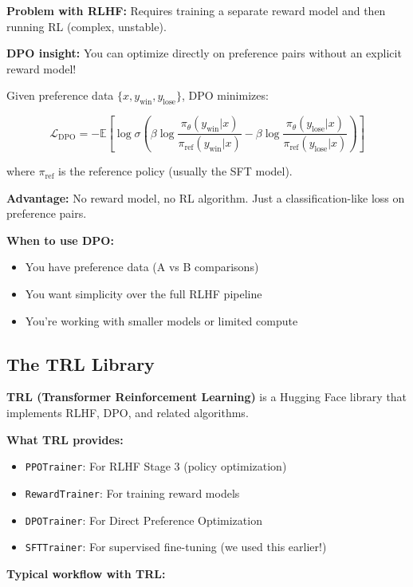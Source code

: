 \documentclass{article}
\begin{document}
\textbf{Problem with RLHF:} Requires training a separate reward model and then running RL (complex, unstable).

\textbf{DPO insight:} You can optimize directly on preference pairs without an explicit reward model!

Given preference data $\{x, y_{\text{win}}, y_{\text{lose}}\}$, DPO minimizes:

\begin{equation}
\mathcal{L}_{\text{DPO}} = -\mathbb{E} \left[ \log \sigma\left( \beta \log \frac{\pi_\theta(y_{\text{win}}|x)}{\pi_{\text{ref}}(y_{\text{win}}|x)} - \beta \log \frac{\pi_\theta(y_{\text{lose}}|x)}{\pi_{\text{ref}}(y_{\text{lose}}|x)} \right) \right]
\end{equation}

where $\pi_{\text{ref}}$ is the reference policy (usually the SFT model).

\textbf{Advantage:} No reward model, no RL algorithm. Just a classification-like loss on preference pairs.

\textbf{When to use DPO:}
\begin{itemize}
\item You have preference data (A vs B comparisons)
\item You want simplicity over the full RLHF pipeline
\item You're working with smaller models or limited compute
\end{itemize}

\subsection{The TRL Library}

\textbf{TRL (Transformer Reinforcement Learning)} is a Hugging Face library that implements RLHF, DPO, and related algorithms.

\textbf{What TRL provides:}
\begin{itemize}
\item \texttt{PPOTrainer}: For RLHF Stage 3 (policy optimization)
\item \texttt{RewardTrainer}: For training reward models
\item \texttt{DPOTrainer}: For Direct Preference Optimization
\item \texttt{SFTTrainer}: For supervised fine-tuning (we used this earlier!)
\end{itemize}

\textbf{Typical workflow with TRL:}
\end{document}
